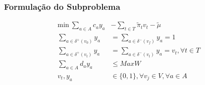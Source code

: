 \documentclass{beamer}
\begin{document}
\begin{frame}
    \frametitle{Formulação do Subproblema}

    \begin{subequations}
        \label{subp}
        \begin{align}
            \label{subp1} \text{min} \: \sum_{a \in A} c_a y_a &- \sum_{t \in T} \tilde{\pi}_t v_t - \tilde{\mu}\\
            \label{subp2} \sum_{a \in \delta^{+} (v_0)} y_{a} &= \sum_{a \in \delta^{-} (v_f)} y_{a} = 1 \\
            \label{subp3} \sum_{a \in \delta^{+} (v_t)} y_{a} &= \sum_{a \in \delta^{-} (v_t)} y_{a} = v_t, \forall t \in T \\
            \label{subp4} \sum_{a \in A} d_a y_{a} &\leq MaxW \\
            \label{subp5} v_t, y_a &\in \{0, 1\}, \forall v_j \in V, \forall a \in A
        \end{align}
    \end{subequations}
\end{frame}
\end{document}
